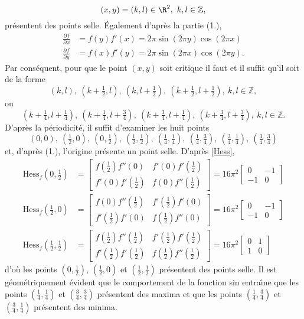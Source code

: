 {\begin{enumerate}
{\begin{equation}
(x,y)=(k,l) \in \R^2,\ k,l \in \mathbb Z,
\label{selle}
\end{equation} 
pr\'esentent des points selle.
\'Egalement d'apr\`es la partie (1.),
\begin{align*}
\frac{\partial f}{\partial x}&=f(y) f'(x)=2 \pi \sin (2\pi y) \cos (2\pi x)
\\
\frac{\partial f}{\partial y}&=f(x) f'(y)=2 \pi \sin (2 \pi x) \cos (2 \pi y).
\end{align*}
Par cons\'equent,
pour que le point $(x,y)$  soit critique
il faut et il suffit qu'il soit de la forme
\[
(k,l),\ (k+\tfrac 12,l),\ (k,l+\tfrac 12),\ (k+\tfrac 12,l+\tfrac 12),\  
k,l \in \mathbb Z,
\]
ou
\[
 (k+\tfrac 14,l+\tfrac 14),
\
 (k+\tfrac 14,l+\tfrac 34),
\
 (k+\tfrac 34,l+\tfrac 14),
\
 (k+\tfrac 34,l+\tfrac 34), \ k,l \in \mathbb Z.
\]
D'apr\`es la p\'eriodicit\'e, il suffit d'examiner les huit points
\[
(0,0),\ (\tfrac 12,0),\ (0,\tfrac 12),\ (\tfrac 12,\tfrac 12),
\
 (\tfrac 14,\tfrac 14),
\
 (\tfrac 14,\tfrac 34),
\
 (\tfrac 34,\tfrac 14),
\
 (\tfrac 34,\tfrac 34)
\]
et, d'apr\`es (1.), l'origine pr\'esente un point selle.
D'apr\`es \eqref{Hess},
\begin{align*}
\mathrm{Hess}_f(0,\tfrac 12)&=\left[\begin{matrix} 
f(\tfrac 12) f''(0) &  f'(0) f'(\tfrac 12)\\  f'(0) f'(\tfrac 12) & f(0)  f''(\tfrac 12)
\end{matrix}\right]=16 \pi^2\left[\begin{matrix} 
0 &  -1\\  -1 & 0
\end{matrix}\right]
\\
\mathrm{Hess}_f(\tfrac 12,0)&=\left[\begin{matrix} 
f(0) f''(\tfrac 12) &  f'(\tfrac 12) f'(0)\\  f'(\tfrac 12) f'(0) & f(\tfrac 12)  f''(0)
\end{matrix}\right]=16 \pi^2\left[\begin{matrix} 
0 &  -1\\  -1 & 0
\end{matrix}\right]
\\
\mathrm{Hess}_f(\tfrac 12,\tfrac 12)&=\left[\begin{matrix} 
f(\tfrac 12) f''(\tfrac 12) &  f'(\tfrac 12) f'(\tfrac 12)\\  f'(\tfrac 12) f'(\tfrac 12) & f(\tfrac 12)  f''(\tfrac 12)
\end{matrix}\right]=16 \pi^2\left[\begin{matrix} 
0 &  1\\  1 & 0
\end{matrix}\right]
\end{align*}
d'o\`u les points $(0,\frac 12)$, $(\tfrac 12,0)$ et $(\tfrac 12,\tfrac 12)$
pr\'esentent des points selle.
Il est g\'eo\-m\'etri\-quement 
\'evident que le comportement de la fonction sin entra\^\i ne
que les points $(\tfrac 14,\tfrac 14)$ et  $(\tfrac 34,\tfrac 34)$
pr\'esentent des maxima et que les points
$(\tfrac 14,\tfrac 34)$ et  $(\tfrac 34,\tfrac 14)$
pr\'esentent des minima.}
\end{enumerate}
}